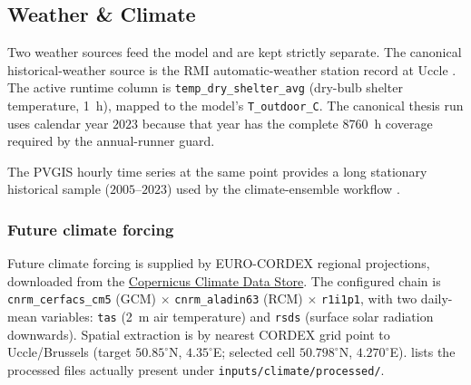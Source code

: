 

\subsection{Weather \& Climate}
\label{sec:weatherClimate}
 
Two weather sources feed the model and are kept strictly separate. The canonical historical-weather source is the RMI automatic-weather station record at Uccle \cite{RMI2024UccleAWS}. The active runtime column is \texttt{temp\_dry\_shelter\_avg} (dry-bulb shelter temperature, \SI{1}{h}), mapped to the model's \texttt{T\_outdoor\_C}. The canonical thesis run uses calendar year $2023$ because that year has the complete \SI{8760}{h} coverage required by the annual-runner guard.
 
The PVGIS hourly time series at the same point provides a long stationary historical sample ($2005$--$2023$) used by the climate-ensemble workflow \cite{Huld2012PVGIS}.

\subsubsection*{Future climate forcing}
Future climate forcing is supplied by EURO-CORDEX \cite{Jacob2014EuroCordex} regional projections, downloaded from the \href{https://apps.climate.copernicus.eu}{Copernicus Climate Data Store}. The configured chain is \texttt{cnrm\_cerfacs\_cm5} (GCM) $\times$ \texttt{cnrm\_aladin63} (RCM) $\times$ \texttt{r1i1p1}, with two daily-mean variables: \texttt{tas} (\SI{2}{m} air temperature) and \texttt{rsds} (surface solar radiation downwards). Spatial extraction is by nearest CORDEX grid point to Uccle/Brussels (target $50.85^{\circ}$N, $4.35^{\circ}$E; selected cell $50.798^{\circ}$N, $4.270^{\circ}$E).  lists the processed files actually present under \texttt{inputs/climate/processed/}.
 
